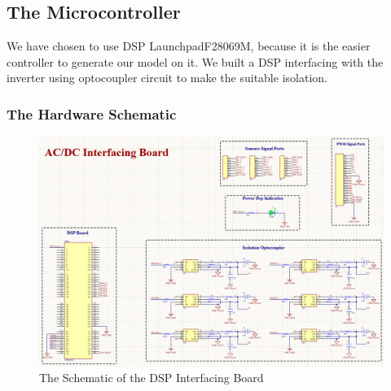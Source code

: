 \documentclass[12pt,a4paper]{book}
\begin{document}
\subsection{The Microcontroller}
We have chosen to use DSP LaunchpadF28069M, because it is the easier controller to generate our model on it. We built a DSP interfacing with the inverter using optocoupler circuit to make the suitable isolation.

\subsubsection{The Hardware Schematic}
\begin{figure}[h!]
  \centering
  \includegraphics[width = 17cm]{image42.png}
  \caption{The Schematic of the DSP Interfacing Board}
  \label{fig:image42}
\end{figure}

\end{document}

